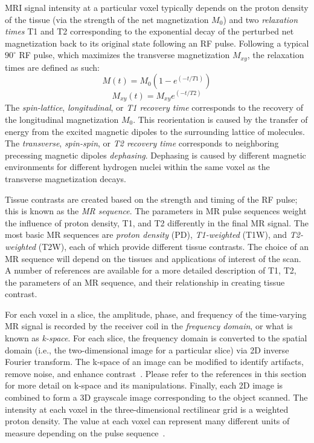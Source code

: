 MRI signal intensity at a particular voxel typically depends on the proton density of the tissue (via the strength of the net magnetization $M_0$) and two \textit{relaxation times} T1 and T2 corresponding to the exponential decay of the perturbed net magnetization back to its original state following an RF pulse. Following a typical $90^{\circ}$ RF pulse, which maximizes the transverse magnetization $M_{xy}$, the relaxation times are defined as such:
\begin{equation}
M(t) = M_0(1 - e^{(-t/T1)})
\end{equation}
\begin{equation}
M_{xy}(t) = M_{xy}e^{(-t/T2)}
\end{equation}
The \textit{spin-lattice}, \textit{longitudinal}, or \textit{T1 recovery time} corresponds to the recovery of the longitudinal magnetization $M_0$. This reorientation is caused by the transfer of energy from the excited magnetic dipoles to the surrounding lattice of molecules. The \textit{transverse}, \textit{spin-spin}, or \textit{T2 recovery time} corresponds to neighboring precessing magnetic dipoles \textit{dephasing}. Dephasing is caused by different magnetic environments for different hydrogen nuclei within the same voxel as the transverse magnetization decays.

Tissue contrasts are created based on the strength and timing of the RF pulse; this is known as the \textit{MR sequence}. The parameters in MR pulse sequences weight the influence of proton density, T1, and T2 differently in the final MR signal. The most basic MR sequences are \textit{proton density} (PD), \textit{T1-weighted} (T1W), and \textit{T2-weighted} (T2W), each of which provide different tissue contrasts. The choice of an MR sequence will depend on the tissues and applications of interest of the scan. A number of references are available  \cite{nishimura_2010, brown_semelka_2003, webb_2003} for a more detailed description of T1, T2, the parameters of an MR sequence, and their relationship in creating tissue contrast.

For each voxel in a slice, the amplitude, phase, and frequency of the time-varying MR signal is recorded by the receiver coil in the \textit{frequency domain}, or what is known as \textit{k-space}. For each slice, the frequency domain is converted to the spatial domain (i.e., the two-dimensional image for a particular slice) via 2D inverse Fourier transform. The k-space of an image can be modified to identify artifacts, remove noise, and enhance contrast~\cite{imaios}. Please refer to the references in this section for more detail on k-space and its manipulations. Finally, each 2D image is combined to form a 3D grayscale image corresponding to the object scanned. The intensity at each voxel in the three-dimensional rectilinear grid is a weighted proton density. The value at each voxel can represent many different units of measure depending on the pulse sequence~\cite{beek_hoffman_2008}.

